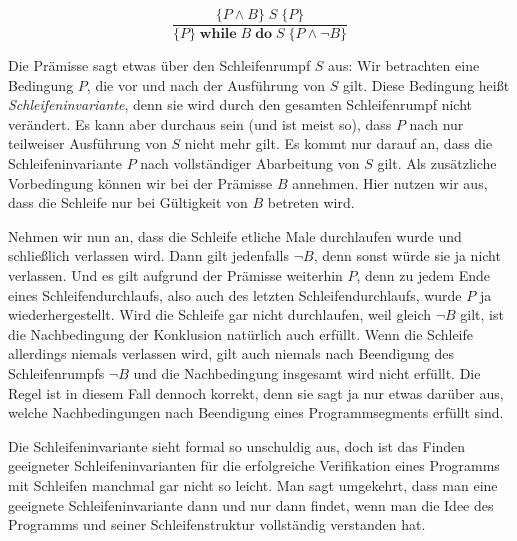 
\vspace{2mm} %

$$\frac{\{P \wedge B\} \; S \; \{P\}}{\{P\} \; \textbf{while} \; B \; \textbf{do} \; S \; \{P \wedge \neg B\} }$$

\vspace{2mm} %

Die Prämisse sagt etwas über den Schleifenrumpf $S$ aus: Wir betrachten eine Bedingung $P$, die vor und nach der Ausführung von $S$ gilt. Diese Bedingung heißt \emph{Schleifen\-invariante}, 
denn sie wird durch den gesamten Schleifenrumpf nicht verändert. Es kann aber durchaus sein (und ist meist so), dass $P$ nach nur teilweiser Ausführung von $S$ nicht mehr gilt. Es kommt nur darauf an, dass die Schleifen\-invariante $P$ nach vollständiger Abarbeitung von $S$ gilt. Als zusätzliche Vorbedingung können wir bei der Prämisse $B$ annehmen. Hier nutzen wir aus, dass die Schleife nur bei Gültigkeit von $B$ betreten wird.

\vspace{2mm} %

Nehmen wir nun an, dass die Schleife etliche Male durchlaufen wurde und schließlich verlassen wird. Dann gilt jedenfalls $\neg B$, denn sonst würde sie ja nicht verlassen. Und es gilt aufgrund der Prämisse weiterhin $P$, denn zu jedem Ende eines Schleifendurchlaufs, also auch des letzten Schleifendurchlaufs, wurde $P$ ja wiederhergestellt. Wird die Schleife gar nicht durchlaufen, weil gleich $\neg B$ gilt, ist die Nachbedingung der Konklusion natürlich auch erfüllt. Wenn die Schleife allerdings niemals verlassen wird, gilt auch niemals nach Beendigung des Schleifenrumpfs $\neg B$ und die Nachbedingung insgesamt wird nicht erfüllt. Die Regel ist in diesem Fall dennoch korrekt, denn sie sagt ja nur etwas darüber aus, welche Nachbedingungen nach Beendigung eines Programmsegments erfüllt sind.

\vspace{2mm} %

Die Schleifeninvariante sieht formal so unschuldig aus, doch ist das Finden geeigneter Schleifeninvarianten für die erfolgreiche Verifikation eines Programms mit Schleifen manchmal gar nicht so leicht. Man sagt umgekehrt, dass man eine geeignete Schlei\-fen\-in\-va\-ri\-ante dann und nur dann findet, wenn man die Idee des Programms und seiner Schleifenstruktur vollständig verstanden hat.

